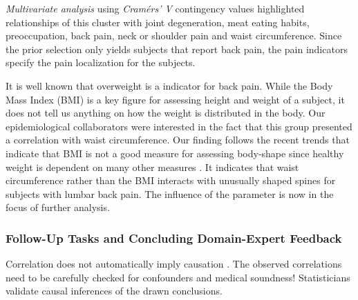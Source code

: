 \documentclass[journal]{style/vgtc} 			          %
\begin{document}
\emph{Multivariate analysis} using \emph{Cram\'{e}rs' V} contingency values highlighted relationships of this cluster with joint degeneration, meat eating habits, preoccupation, back pain, neck or shoulder pain and waist circumference.
%
Since the prior selection only yields subjects that report back pain, the pain indicators specify the pain localization for the subjects.

It is well known that overweight is a indicator for back pain.
%
While the Body Mass Index (BMI) is a key figure for assessing height and weight of a subject, it does not tell us anything on how the weight is distributed in the body.
%
Our epidemiological collaborators were interested in the fact that this group presented a correlation with waist circumference.
%
Our finding follows the recent trends that indicate that BMI is not a good measure for assessing body-shape since healthy weight is dependent on many other measures \cite{Ahima2013}.
%
It indicates that waist circumference rather than the BMI interacts with unusually shaped spines for subjects with lumbar back pain.
%
The influence of the parameter is now in the focus of further analysis.

\subsubsection{Follow-Up Tasks and Concluding Domain-Expert Feedback}
%
Correlation does not automatically imply causation \cite{Tufte2003}.
%
The observed correlations need to be carefully checked for confounders and medical soundness!
%
Statisticians validate causal inferences of the drawn conclusions.
\end{document}
